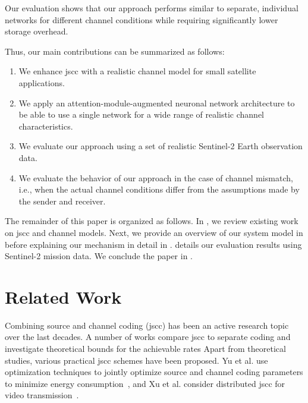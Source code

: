 \documentclass[conference]{IEEEtran}
\newcommand\sentinelii{Sentinel-2\xspace}
\begin{document}
Our evaluation shows that our approach performs similar to separate, individual networks for different channel conditions while requiring significantly lower storage overhead.

Thus, our main contributions can be summarized as follows:
%
\begin{enumerate}
  \item We enhance \ac{jscc} with a realistic channel model for small satellite applications.
  \item We apply an attention-module-augmented neuronal network architecture to be able to use a single network for a wide range of realistic channel characteristics.
  \item We evaluate our approach using a set of realistic \sentinelii Earth observation data.
  \item We evaluate the behavior of our approach in the case of channel mismatch, i.e., when the actual channel conditions differ from the assumptions made by the sender and receiver.
\end{enumerate}

The remainder of this paper is organized as follows.
In , we review existing work on \ac{jscc} and channel models.
Next, we provide an overview of our system model in  before explaining our mechanism in detail in .
 details our evaluation results using \sentinelii mission data.
We conclude the paper in .

\section{Related Work}
\label{sec:related_work}

Combining source and channel coding (\acs{jscc}) has been an active research topic over the last decades.
A number of works compare \ac{jscc} to separate coding and investigate theoretical bounds for the achievable rates \cite{gallager1968information,1614076,4557472}
Apart from theoretical studies, various practical \ac{jscc} schemes have been proposed.
Yu et al. use optimization techniques to jointly optimize source and channel coding parameters to minimize energy consumption~\cite{Wei2004}, and
Xu et al. consider distributed \ac{jscc} for video transmission~\cite{4205066}. 
\end{document}
